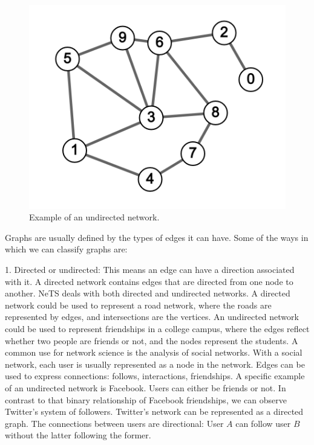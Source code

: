 \begin{figure}[H]
  \centering
    \includegraphics[scale=.25]{img/undirected_sample.png}
    \caption{Example of an undirected network.}
    \label{fig:net_un}
\end{figure}

Graphs are usually defined by the types of edges it can have.
Some of the ways in which we can classify graphs are:

1. Directed or undirected: This means an edge can have a direction associated with it.
A directed network contains edges that are directed from one node to another.
NeTS deals with both directed and undirected networks.
A directed network could be used to represent a road network,
where the roads are represented by edges, and intersections are the vertices.
An undirected network could be used to represent friendships in a college campus,
where the edges reflect whether two people are friends or not,
and the nodes represent the students.
A common use for network science is the analysis of social networks.
With a social network, each user is usually represented as a node in the network.
Edges can be used to express connections: follows, interactions, friendships.
A specific example of an undirected network is Facebook.
Users can either be friends or not.
In contrast to that binary relationship of Facebook friendships,
we can observe Twitter's system of followers.
Twitter's network can be represented as a directed graph.
The connections between users are directional:
User $A$ can follow user $B$ without the latter following the former.

